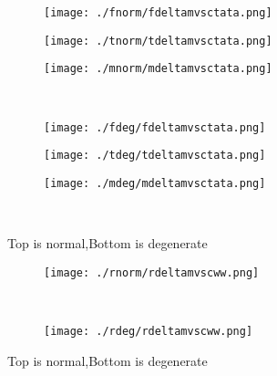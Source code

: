 \documentclass[aps,floats,floatfix,nofootinbib]{revtex4-1}
\begin{document}
\begin{center}
\begin{figure}
\begin{subfigure}{0.3\textwidth}
\texttt{[image: ./fnorm/fdeltamvsctata.png]}
\label{}
\end{subfigure}
\begin{subfigure}{0.3\textwidth}
\texttt{[image: ./tnorm/tdeltamvsctata.png]}
\label{}
\end{subfigure}
\begin{subfigure}{0.3\textwidth}
\texttt{[image: ./mnorm/mdeltamvsctata.png]}
\label{}
\end{subfigure}\\
\begin{subfigure}{0.3\textwidth}
\texttt{[image: ./fdeg/fdeltamvsctata.png]}
\label{}
\end{subfigure}
\begin{subfigure}{0.3\textwidth}
\texttt{[image: ./tdeg/tdeltamvsctata.png]}
\label{}
\end{subfigure}
\begin{subfigure}{0.3\textwidth}
\texttt{[image: ./mdeg/mdeltamvsctata.png]}
\label{}
\end{subfigure}\\
\caption{Top is normal,Bottom is degenerate}
\end{figure}
\end{center}

\begin{center}
\begin{figure}
\begin{subfigure}{0.95\textwidth}
\texttt{[image: ./rnorm/rdeltamvscww.png]}
\label{}
\end{subfigure}\\
\begin{subfigure}{0.95\textwidth}
\texttt{[image: ./rdeg/rdeltamvscww.png]}
\label{}
\end{subfigure}
\caption{Top is normal,Bottom is degenerate}
\end{figure}
\end{center}
\end{document}
